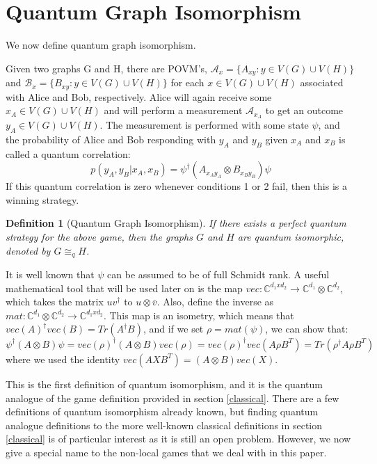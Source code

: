 \documentclass[12pt]{article}
\newtheorem{defn}[thm]{Definition}
\begin{document}
\section{Quantum Graph Isomorphism}
We now define quantum graph isomorphism. 

Given two graphs G and H, there are POVM's, $\mathcal{A}_x = \{A_{xy}: y \in V(G) \cup V(H)\}$ and $\mathcal{B}_x = \{B_{xy}: y \in V(G) \cup V(H)\}$ for each $x \in V(G) \cup V(H)$ associated with Alice and Bob, respectively.
Alice will again receive some $x_A \in V(G) \cup V(H)$ and will perform a measurement $\mathcal{A}_{x_A}$ to get an outcome $y_A \in V(G) \cup V(H)$.
The measurement is performed with some state $\psi$, and the probability of Alice and Bob responding with $y_A$ and $y_B$ given $x_A$ and $x_B$ is called a quantum correlation: 
\begin{equation}
p(y_A, y_B|x_A, x_B) = \psi^\dag(A_{x_Ay_A}\otimes B_{x_By_B})\psi
\end{equation}
If this quantum correlation is zero whenever conditions 1 or 2 fail, then this is a winning strategy.

\begin{defn}[Quantum Graph Isomorphism]
\label{qgame}
If there exists a perfect quantum strategy for the above game, then the graphs $G$ and $H$ are quantum isomorphic, denoted by $G \cong_q H$.
\end{defn}

It is well known that $\psi$ can be assumed to be of full Schmidt rank. A useful mathematical tool that will be used later on is the map $vec: \mathbb{C}^{d_1 x d_2} \longrightarrow \mathbb{C}^{d_1} \otimes \mathbb{C}^{d_2}$, which takes the matrix $uv^{\dag}$ to $u\otimes \bar{v}$. Also, define the inverse as $mat: \mathbb{C}^{d_1} \otimes \mathbb{C}^{d_2} \longrightarrow \mathbb{C}^{d_1 x d_2}$. This map is an isometry, which means that $vec(A)^{\dag}vec(B) = Tr(A^{\dag}B)$, and if we set $\rho = mat(\psi)$, we can show that: 
\begin{equation}
\label{isometry}
\psi^{\dag} (A \otimes B) \psi = vec(\rho)^{\dag} (A \otimes B) vec(\rho) = vec(\rho)^{\dag} vec(A \rho B^T) = Tr(\rho^{\dag} A\rho B^T)
\end{equation}
where we used the identity $vec(AXB^T) = (A \otimes B)vec(X)$.

This is the first definition of quantum isomorphism, and it is the quantum analogue of the game definition provided in section \ref{classical}. There are a few definitions of quantum isomorphism already known, but finding quantum analogue definitions to the more well-known classical definitions in section \ref{classical} is of particular interest as it is still an open problem. However, we now give a special name to the non-local games that we deal with in this paper.
\end{document}
